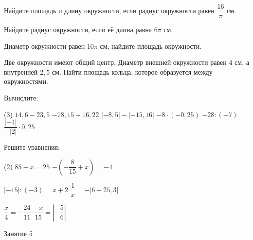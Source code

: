 \begin{homework}[number=2]
	\begin{listofex}
		\item Найдите площадь и длину окружности, если радиус окружности равен \( \dfrac{16}{\pi} \) см.
		\item Найдите радиус окружности, если её длина равна \( 6\pi \) см.
		\item Диаметр окружности равен \(10\pi\) см, найдите площадь окружности.
		\item Две окружности имеют общий центр. Диаметр внешней окружности равен \(4\) см, а внутренней \(2,5\) см. Найти площадь кольца, которое образуется между окружностями.
		\item Вычислите:
		\begin{tasks}(3)
			\task \( 14,6-23,5 \)
			\task \( -78,15 + 16,22 \)
			\task \( |-8,5| - |-15,16| \)
			\task \( -8 \cdot (-0,25)\)
			\task \( -28 : (-7) \)
			\task \( \dfrac{|-4|}{-|2|} \cdot 0,25 \)
		\end{tasks}
		\item Решите уравнения:
		\begin{tasks}(2)
			\task \( 85-x=25 \)
			\task \( -\left( -\dfrac{8}{15} + x \right) = -4 \)
			
			\task \( |-15|:(-3)=x+2 \)
			\task \( \dfrac{1}{x} = -|6-25,3| \)
			
			\task \( \dfrac{x}{4} = -\dfrac{24}{11} \)
			\task \( \dfrac{-x}{15} = \left| -\dfrac{5}{6} \right| \)
		\end{tasks}
	\end{listofex}
\end{homework}

\begin{class}[number=5]
	\begin{listofex}
		\item Занятие 5
	\end{listofex}
\end{class}

